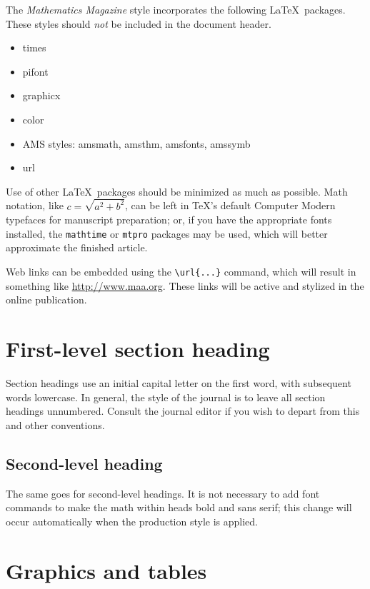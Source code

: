\documentclass{article}
\theoremstyle{theorem}
\theoremstyle{definition}
\begin{document}
    The \textit{Mathematics Magazine} style incorporates the following \LaTeX\ packages.  These styles should \textit{not} be included in the document header.
    \begin{itemize}
        \item times
        \item pifont
        \item graphicx
        \item color
        \item AMS styles: amsmath, amsthm, amsfonts, amssymb
        \item url
    \end{itemize}
    Use of other \LaTeX\ packages should be minimized as much as possible. Math notation, like $c = \sqrt{a^2 +b^2}$, can be left in \TeX's default Computer Modern typefaces for manuscript preparation; or, if you have the appropriate fonts installed, the \texttt{mathtime} or \texttt{mtpro} packages may be used, which will better approximate the finished article.

    Web links can be embedded using the \verb~\url{...}~ command, which will result in something like \url{http://www.maa.org}.  These links will be active and stylized in the online publication.

    \section{First-level section heading}

    Section headings use an initial capital letter on the first word, with subsequent words lowercase.  In general, the style of the journal is to leave all section headings unnumbered.  Consult the journal editor if you wish to depart from this and other conventions.

    \subsection{Second-level heading}

    The same goes for second-level headings.  It is not necessary to add font commands to make the math within heads bold and sans serif; this change will occur automatically when the production style is applied.

    \section{Graphics and tables}
\end{document}
